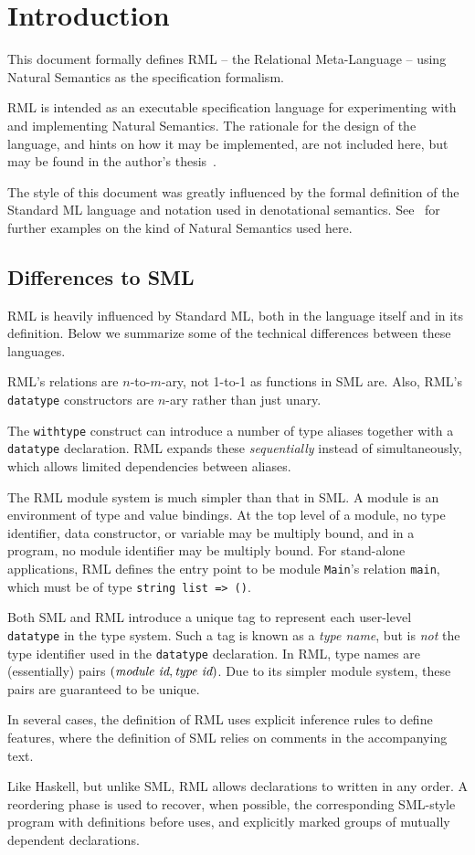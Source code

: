 %
\section{Introduction}
This document formally defines RML -- the Relational Meta-Language --
using Natural Semantics as the specification formalism.

RML is intended as an executable specification language for
experimenting with and implementing Natural Semantics.
The rationale for the design of the language, and hints
on how it may be implemented, are not included here,
but may be found in the author's thesis~\cite{Pettersson95:thesis}.

The style of this document was greatly influenced by the
formal definition of the Standard ML language and
notation used in denotational semantics.
See~\cite{MTH90,MT91,MTHM97} for further examples
on the kind of Natural Semantics used here.

\subsection{Differences to SML}
RML is heavily influenced by Standard ML, both in the language
itself and in its definition.
Below we summarize some of the technical differences between these languages.

RML's relations are $n$-to-$m$-ary, not 1-to-1 as functions in SML are.
Also, RML's \texttt{datatype} constructors are $n$-ary rather than just unary.

The \texttt{withtype} construct can introduce a number of type aliases
together with a \texttt{datatype} declaration.
RML expands these \emph{sequentially} instead of simultaneously,
which allows limited dependencies between aliases.

The RML module system is much simpler than that in SML.
A module is an environment of type and value bindings.
At the top level of a module, no type identifier, data constructor, or variable
may be multiply bound, and
in a program, no module identifier may be multiply bound.
For stand-alone applications, RML defines the entry point to
be module \texttt{Main}'s relation \texttt{main}, which must
be of type \texttt{string list => ()}.

Both SML and RML introduce a unique tag to represent each user-level
\texttt{datatype} in the type system. Such a tag is known as a \emph{type name},
but is \emph{not} the type identifier used in the \texttt{datatype} declaration.
In RML, type names are (essentially) pairs $(\emph{module id},\emph{type id})$.
Due to its simpler module system, these pairs are guaranteed to
be unique.

In several cases, the definition of RML uses explicit inference rules
to define features, where the definition of SML relies on comments in
the accompanying text.

Like Haskell, but unlike SML, RML allows declarations to written
in any order. A reordering phase is used to recover, when possible,
the corresponding SML-style program with definitions before uses,
and explicitly marked groups of mutually dependent declarations.
